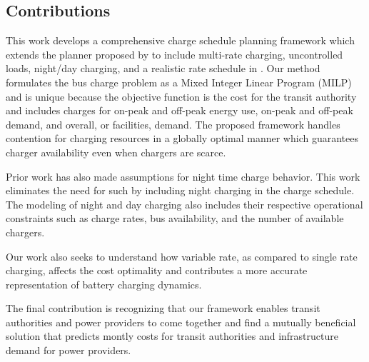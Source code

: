 \subsection{Contributions}
This work develops a comprehensive charge schedule planning framework which extends the planner proposed by \cite{whitaker_network_2021} to include multi-rate charging, uncontrolled loads, night/day charging, and a realistic rate schedule in \cite{noauthor_rocky_nodate}. Our method formulates the bus charge problem as a Mixed Integer Linear Program (MILP) and is unique because the objective function is the cost for the transit authority and includes charges for on-peak and off-peak energy use, on-peak and off-peak demand, and overall, or facilities, demand. The proposed framework handles contention for charging resources in a globally optimal manner which guarantees charger availability even when chargers are scarce.
\par Prior work has also made assumptions for night time charge behavior. This work eliminates the need for such by including night charging in the charge schedule. The modeling of night and day charging also includes their respective operational constraints such as charge rates, bus availability, and the number of available chargers.
\par Our work also seeks to understand how variable rate, as compared to single rate charging, affects the cost optimality and contributes a more accurate representation of battery charging dynamics. 
\par The final contribution is recognizing that our framework enables transit authorities and power providers to come together and find a mutually beneficial solution that predicts montly costs for transit authorities and infrastructure demand for power providers.

